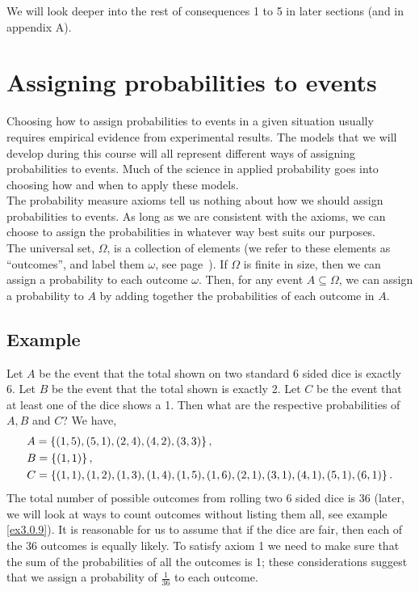 \noindent We will look deeper into the rest of consequences 1 to 5 in later sections (and in appendix A).



\section{Assigning probabilities to events}
Choosing how to assign probabilities to events in a given situation usually requires empirical evidence from experimental results. The models that we will develop during this course will all represent different ways of assigning probabilities to events. Much of the science in applied probability goes into choosing how and when to apply these models. \\

\noindent The probability measure axioms tell us nothing about how we should assign probabilities to events. As long as we are consistent with the axioms, we can choose to assign the probabilities in whatever way best suits our purposes. \\

\noindent The universal set, $\Omega$, is a collection of elements (we refer to these elements as ``outcomes'', and label them $\omega$, see page~\pageref{outcome}). If $\Omega$ is finite in size, then we can assign a probability to each outcome $\omega.$ Then, for any event $A \subseteq \Omega$, we can assign a probability to $A$ by adding together the probabilities of each outcome in $A$.
\subsection{Example} \label{example2.2.1}
Let $A$ be the event that the total shown on two standard 6 sided dice is exactly 6. Let $B$ be the event that the total shown is exactly 2. Let $C$ be the event that at least one of the dice shows a 1.  Then what are the respective probabilities of $A,B$ and $C$? We have,
\begin{align*}
&A = \left\{(1,5),(5,1),(2,4),(4,2),(3,3)\right\}, \\
&B = \left\{(1,1)\right\}, \\
&C = \left\{(1,1),(1,2),(1,3),(1,4),(1,5),(1,6),(2,1),(3,1),(4,1),(5,1),(6,1)\right\}.
\end{align*}
The total number of possible outcomes from rolling two 6 sided dice is 36 (later, we will look at ways to count outcomes without listing them all, see example \ref{ex3.0.9}). It is reasonable for us to assume that if the dice are fair, then each of the 36 outcomes is equally likely. To satisfy axiom 1 we need to make sure that the sum of the probabilities of all the outcomes is 1; these considerations suggest that we assign a probability of $\frac{1}{36}$ to each outcome. \\

